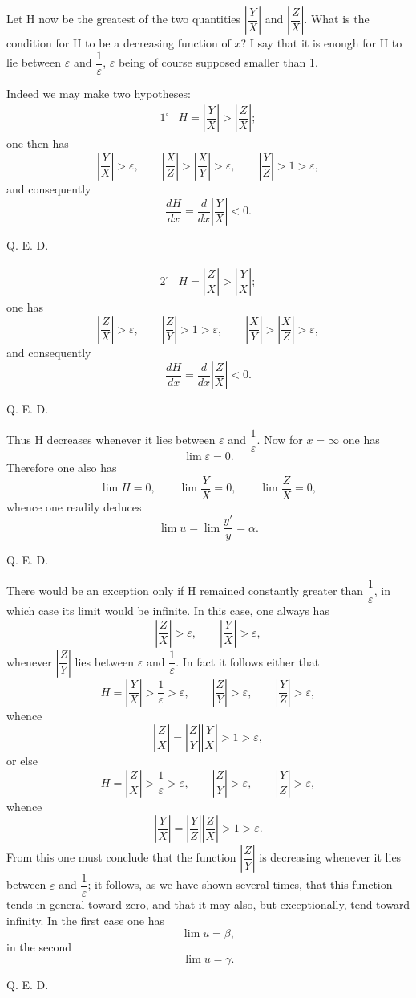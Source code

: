 \documentclass[11pt]{article}
\begin{document}
Let H now be the greatest of the two quantities $\left|\dfrac{Y}{X}\right|$ and $\left|\dfrac{Z}{X}\right|$. What is the condition for H to be a decreasing function of $x$? I say that it is enough for H to lie between $\varepsilon$ and $\dfrac1\varepsilon$, $\varepsilon$ being of course supposed smaller than 1.

Indeed we may make two hypotheses:
\[
\begin{array}{rl}
1^\circ& H=\left|\dfrac{Y}{X}\right|>\left|\dfrac{Z}{X}\right|;
\end{array}
\]
one then has
\[
\left|\frac{Y}{X}\right|>\varepsilon,
\qquad
\left|\frac{X}{Z}\right|>\left|\frac{X}{Y}\right|>\varepsilon,
\qquad
\left|\frac{Y}{Z}\right|>1>\varepsilon,
\]
and consequently
\[
\frac{dH}{dx}=\frac{d}{dx}\left|\frac{Y}{X}\right|<0.
\]
\begin{flushright}Q. E. D.\end{flushright}
\[
\begin{array}{rl}
2^\circ& H=\left|\dfrac{Z}{X}\right|>\left|\dfrac{Y}{X}\right|;
\end{array}
\]
one has
\[
\left|\frac{Z}{X}\right|>\varepsilon,
\qquad
\left|\frac{Z}{Y}\right|>1>\varepsilon,
\qquad
\left|\frac{X}{Y}\right|>\left|\frac{X}{Z}\right|>\varepsilon,
\]
and consequently
\[
\frac{dH}{dx}=\frac{d}{dx}\left|\frac{Z}{X}\right|<0.
\]
\begin{flushright}Q. E. D.\end{flushright}
Thus H decreases whenever it lies between $\varepsilon$ and $\dfrac1\varepsilon$. Now for $x=\infty$ one has
\[
\lim\varepsilon=0.
\]
Therefore one also has
\[
\lim H=0,
\qquad
\lim\frac{Y}{X}=0,
\qquad
\lim\frac{Z}{X}=0,
\]
whence one readily deduces
\[
\lim u=\lim\frac{y'}{y}=\alpha.
\]
\begin{flushright}Q. E. D.\end{flushright}

There would be an exception only if H remained constantly greater than $\dfrac1\varepsilon$, in which case its limit would be infinite. In this case, one always has
\[
\left|\frac{Z}{X}\right|>\varepsilon,
\qquad
\left|\frac{Y}{X}\right|>\varepsilon,
\]
whenever $\left|\dfrac{Z}{Y}\right|$ lies between $\varepsilon$ and $\dfrac1\varepsilon$. In fact it follows either that
\[
H=\left|\frac{Y}{X}\right|>\frac1\varepsilon>\varepsilon,
\qquad
\left|\frac{Z}{Y}\right|>\varepsilon,
\qquad
\left|\frac{Y}{Z}\right|>\varepsilon,
\]
whence
\[
\left|\frac{Z}{X}\right|=\left|\frac{Z}{Y}\right|\left|\frac{Y}{X}\right|>1>\varepsilon,
\]
or else
\[
H=\left|\frac{Z}{X}\right|>\frac1\varepsilon>\varepsilon,
\qquad
\left|\frac{Z}{Y}\right|>\varepsilon,
\qquad
\left|\frac{Y}{Z}\right|>\varepsilon,
\]
whence
\[
\left|\frac{Y}{X}\right|=\left|\frac{Y}{Z}\right|\left|\frac{Z}{X}\right|>1>\varepsilon.
\]
From this one must conclude that the function $\left|\dfrac{Z}{Y}\right|$ is decreasing whenever it lies between $\varepsilon$ and $\dfrac1\varepsilon$; it follows, as we have shown several times, that this function tends in general toward zero, and that it may also, but exceptionally, tend toward infinity. In the first case one has
\[
\lim u=\beta,
\]
in the second
\[
\lim u=\gamma.
\]
\begin{flushright}Q. E. D.\end{flushright}
\end{document}
